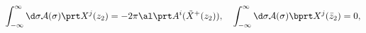 \begin{equation}
\begin{split}
\int_{-\infty}^\infty
\d \sigma {\cal A}(\sigma)\prt X^j(z_2)
=-2\pi \al \prt A^i(\tilde X^+(z_2)),\quad
\int_{-\infty}^\infty
\d \sigma {\cal A}(\sigma)\bprt X^j(\bar z_2)=0,
\end{split}\label{hol n1}
\end{equation}

